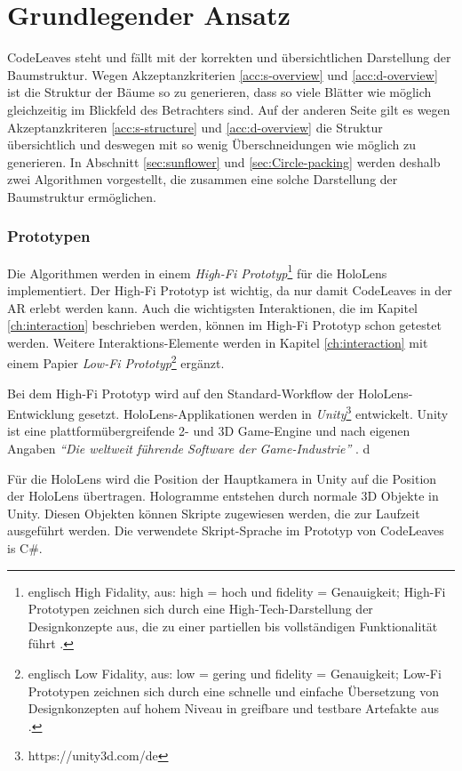 \section{Grundlegender Ansatz}

CodeLeaves steht und fällt mit der korrekten und übersichtlichen Darstellung der Baumstruktur. Wegen Akzeptanzkriterien \ref{acc:s-overview} und \ref{acc:d-overview} ist die Struktur der Bäume so zu generieren, dass so viele Blätter wie möglich gleichzeitig im Blickfeld des Betrachters sind. Auf der anderen Seite gilt es wegen Akzeptanzkriteren \ref{acc:s-structure} und \ref{acc:d-overview} die Struktur übersichtlich und deswegen mit so wenig Überschneidungen wie möglich zu generieren. In Abschnitt \ref{sec:sunflower} und \ref{sec:Circle-packing} werden deshalb zwei Algorithmen vorgestellt, die zusammen eine solche Darstellung der Baumstruktur ermöglichen. 

\subsubsection*{Prototypen}

Die Algorithmen werden in einem \textit{High-Fi Prototyp}\footnote{englisch High Fidality, aus: high = hoch und fidelity = Genauigkeit; High-Fi Prototypen zeichnen sich durch eine High-Tech-Darstellung der Designkonzepte aus, die zu einer partiellen bis vollständigen Funktionalität führt \cite{egger2000fi}.} für die HoloLens implementiert. Der High-Fi Prototyp ist wichtig, da nur damit CodeLeaves in der AR erlebt werden kann. Auch die wichtigsten Interaktionen, die im Kapitel \ref{ch:interaction} beschrieben werden, können im High-Fi Prototyp schon getestet werden. Weitere Interaktions-Elemente werden in Kapitel \ref{ch:interaction} mit einem Papier \textit{Low-Fi Prototyp}\footnote{englisch Low Fidality, aus: low = gering und fidelity = Genauigkeit; Low-Fi Prototypen zeichnen sich durch eine schnelle und einfache Übersetzung von Designkonzepten auf hohem Niveau in greifbare und testbare Artefakte aus \cite{egger2000fi}.} ergänzt.

Bei dem High-Fi Prototyp wird auf den Standard-Workflow der HoloLens-Entwicklung gesetzt. HoloLens-Applikationen werden in \textit{Unity}\footnote{https://unity3d.com/de} entwickelt. Unity ist eine platt\-form\-über\-grei\-fen\-de 2- und 3D Game-Engine und nach eigenen Angaben \textit{"`Die weltweit führende Software der Game-Industrie"'} \cite{unity2017public}. d

Für die HoloLens wird die Position der Hauptkamera in Unity auf die Position der HoloLens übertragen. Hologramme entstehen durch normale 3D Objekte in Unity. Diesen Objekten können Skripte zugewiesen werden, die zur Laufzeit ausgeführt werden. Die verwendete Skript-Sprache im Prototyp von CodeLeaves is C\#.

